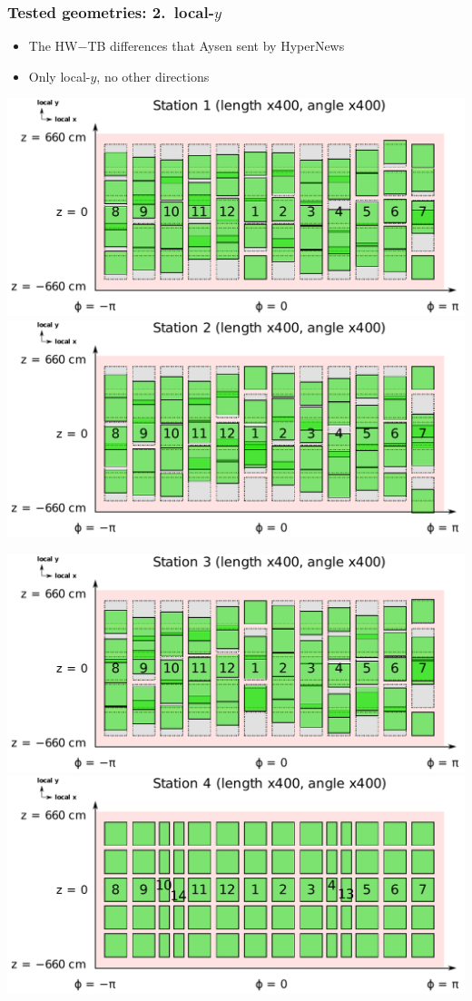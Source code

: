 \documentclass[compress]{beamer}
\begin{document}
\begin{frame}
\frametitle{Tested geometries: 2.\ local-$y$}
\begin{itemize}
\item The HW$-$TB differences that Aysen sent by HyperNews
\item Only local-$y$, no other directions
\end{itemize}

\vfill
\includegraphics[width=0.49\linewidth]{localy_station1.pdf}
\includegraphics[width=0.49\linewidth]{localy_station2.pdf}

\includegraphics[width=0.49\linewidth]{localy_station3.pdf}
\includegraphics[width=0.49\linewidth]{localy_station4.pdf}
\end{frame}
\end{document}
